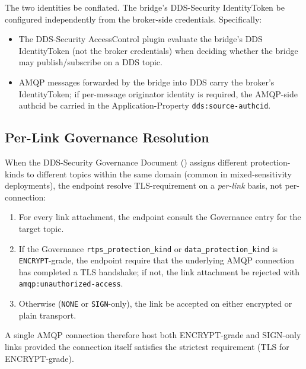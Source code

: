 \documentclass{../styles/zerodds-vendor-spec}
\begin{document}
The two identities  be conflated. The bridge's
DDS-Security IdentityToken  be configured
independently from the broker-side credentials. Specifically:

\begin{itemize}
  \item The DDS-Security AccessControl plugin 
        evaluate the bridge's DDS IdentityToken (not the broker
        credentials) when deciding whether the bridge may
        publish/subscribe on a DDS topic.
  \item AMQP messages forwarded by the bridge into DDS
         carry the broker's IdentityToken; if
        per-message originator identity is required, the
        AMQP-side authcid  be carried in the
        Application-Property \texttt{dds:source-authcid}.
\end{itemize}

\subsection{Per-Link Governance Resolution}\label{sec:per-link-governance}

When the DDS-Security Governance Document
() assigns different
protection-kinds to different topics within the same domain
(common in mixed-sensitivity deployments), the endpoint
 resolve TLS-requirement on a \emph{per-link}
basis, not per-connection:

\begin{enumerate}
  \item For every link attachment, the endpoint 
        consult the Governance entry for the target topic.
  \item If the Governance \texttt{rtps\_protection\_kind} or
        \texttt{data\_protection\_kind} is
        \texttt{ENCRYPT}-grade, the endpoint 
        require that the underlying AMQP connection has
        completed a TLS handshake; if not, the link attachment
         be rejected with
        \texttt{amqp:unauthorized-access}.
  \item Otherwise (\texttt{NONE} or \texttt{SIGN}-only), the
        link  be accepted on either encrypted or
        plain transport.
\end{enumerate}

A single AMQP connection  therefore host both
ENCRYPT-grade and SIGN-only links provided the connection
itself satisfies the strictest requirement (TLS for ENCRYPT-grade).
\end{document}
